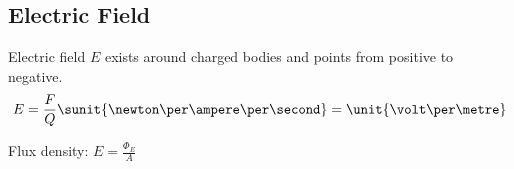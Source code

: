 
\subsection{Electric Field} %
	
	Electric field $E$ exists around charged bodies and points from positive to negative.
	\[
		E = \frac{F}{Q} \sunit{\newton\per\ampere\per\second} = \unit{\volt\per\metre}
	\]
	
	Flux density: $E=\frac{\Phi_E}{A}$
	
